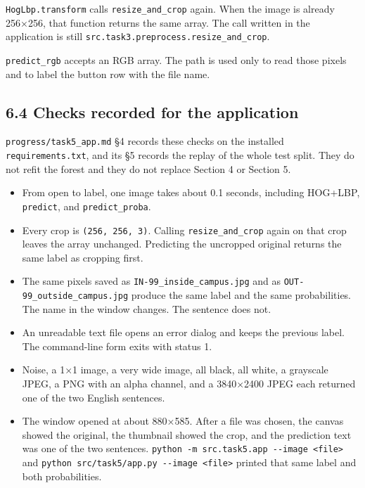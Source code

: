 \documentclass[11pt,a4paper]{article}
\providecommand{\tightlist}{%
  \setlength{\itemsep}{0pt}\setlength{\parskip}{0pt}}
\begin{document}
\texttt{HogLbp.transform} calls \texttt{resize\_\allowbreak{}and\_\allowbreak{}crop} again. When the image is already 256×256, that function returns the same array. The call written in the application is still \texttt{src.task3.preprocess.resize\_\allowbreak{}and\_\allowbreak{}crop}.

\texttt{predict\_\allowbreak{}rgb} accepts an RGB array. The path is used only to read those pixels and to label the button row with the file name.

\subsection{6.4 Checks recorded for the application}\label{checks-recorded-for-the-application}

\texttt{progress/\allowbreak{}task5\_\allowbreak{}app.md} §4 records these checks on the installed \texttt{requirements.txt}, and its §5 records the replay of the whole test split. They do not refit the forest and they do not replace Section 4 or Section 5.

\begin{itemize}
\tightlist
\item
  From open to label, one image takes about 0.1 seconds, including HOG+LBP, \texttt{predict}, and \texttt{predict\_\allowbreak{}proba}.
\item
  Every crop is \texttt{(256,\ 256,\ 3)}. Calling \texttt{resize\_\allowbreak{}and\_\allowbreak{}crop} again on that crop leaves the array unchanged. Predicting the uncropped original returns the same label as cropping first.
\item
  The same pixels saved as \texttt{IN-\allowbreak{}99\_\allowbreak{}inside\_\allowbreak{}campus.jpg} and as \texttt{OUT-\allowbreak{}99\_\allowbreak{}outside\_\allowbreak{}campus.jpg} produce the same label and the same probabilities. The name in the window changes. The sentence does not.
\item
  An unreadable text file opens an error dialog and keeps the previous label. The command-line form exits with status 1.
\item
  Noise, a 1×1 image, a very wide image, all black, all white, a grayscale JPEG, a PNG with an alpha channel, and a 3840×2400 JPEG each returned one of the two English sentences.
\item
  The window opened at about 880×585. After a file was chosen, the canvas showed the original, the thumbnail showed the crop, and the prediction text was one of the two sentences. \texttt{python\ -\allowbreak{}m\ src.task5.app\ -\allowbreak{}\/\allowbreak{}-\allowbreak{}image\ \textless{}file\textgreater{}} and \texttt{python\ src/\allowbreak{}task5/\allowbreak{}app.py\ -\allowbreak{}\/\allowbreak{}-\allowbreak{}image\ \textless{}file\textgreater{}} printed that same label and both probabilities.
\end{itemize}
\end{document}
